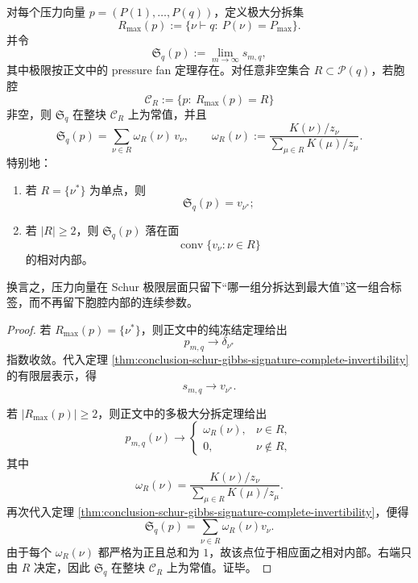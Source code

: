 \begin{theorem}[压力扇形在字符单纯形中的整胞塌缩]\label{thm:conclusion-pressure-fan-collapses-to-character-simplex-cells}
对每个压力向量 \(p=(P(1),\dots,P(q))\)，定义极大分拆集
\[
R_{\max}(p):=\{\nu\vdash q:\ P(\nu)=P_{\max}\}.
\]
并令
\[
\mathfrak S_q(p):=\lim_{m\to\infty}s_{m,q},
\]
其中极限按正文中的 pressure fan 定理存在。对任意非空集合 \(R\subset \mathcal P(q)\)，若胞腔
\[
\mathcal C_R:=\{p:\ R_{\max}(p)=R\}
\]
非空，则 \(\mathfrak S_q\) 在整块 \(\mathcal C_R\) 上为常值，并且
\[
\mathfrak S_q(p)=\sum_{\nu\in R}\omega_R(\nu)\,v_\nu,
\qquad
\omega_R(\nu):=
\frac{K(\nu)/z_\nu}{\sum_{\mu\in R}K(\mu)/z_\mu}.
\]
特别地：
\begin{enumerate}
\item 若 \(R=\{\nu^\ast\}\) 为单点，则
\[
\mathfrak S_q(p)=v_{\nu^\ast};
\]
\item 若 \(|R|\ge 2\)，则 \(\mathfrak S_q(p)\) 落在面
\[
\operatorname{conv}\{v_\nu:\nu\in R\}
\]
的相对内部。
\end{enumerate}
换言之，压力向量在 Schur 极限层面只留下“哪一组分拆达到最大值”这一组合标签，而不再留下胞腔内部的连续参数。
\end{theorem}
\begin{proof}
若 \(R_{\max}(p)=\{\nu^\ast\}\)，则正文中的纯冻结定理给出
\[
p_{m,q}\to \delta_{\nu^\ast}
\]
指数收敛。代入定理 \ref{thm:conclusion-schur-gibbs-signature-complete-invertibility} 的有限层表示，得
\[
s_{m,q}\to v_{\nu^\ast}.
\]

若 \(|R_{\max}(p)|\ge 2\)，则正文中的多极大分拆定理给出
\[
p_{m,q}(\nu)\to
\begin{cases}
\omega_R(\nu),& \nu\in R,\\
0,& \nu\notin R,
\end{cases}
\]
其中
\[
\omega_R(\nu)=\frac{K(\nu)/z_\nu}{\sum_{\mu\in R}K(\mu)/z_\mu}.
\]
再次代入定理 \ref{thm:conclusion-schur-gibbs-signature-complete-invertibility}，便得
\[
\mathfrak S_q(p)=\sum_{\nu\in R}\omega_R(\nu)v_\nu.
\]
由于每个 \(\omega_R(\nu)\) 都严格为正且总和为 \(1\)，故该点位于相应面之相对内部。右端只由 \(R\) 决定，因此 \(\mathfrak S_q\) 在整块 \(\mathcal C_R\) 上为常值。证毕。
\end{proof}

